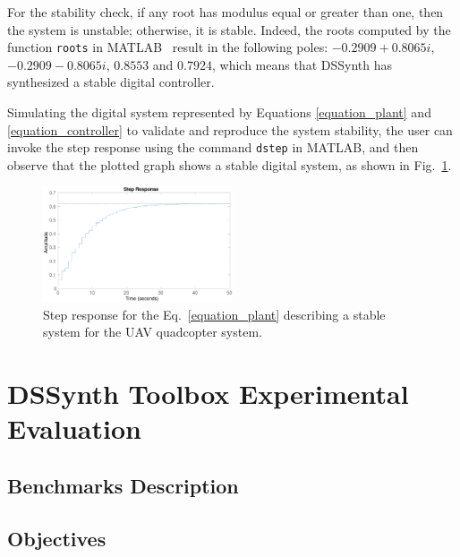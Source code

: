 \documentclass[10pt,conference]{IEEEtran}
\newcommand\tool{{DSSynth Toolbox}\xspace}
\begin{document}
For the stability check, if any root has modulus equal or greater than one, then the system is unstable; 
otherwise, it is stable. Indeed, the roots computed by the function \texttt{roots} 
in MATLAB~\cite{matlab-toolbox} result in the following poles: 
$-0.2909 + 0.8065i$, $-0.2909 - 0.8065i$, $0.8553$ and $0.7924$, 
which means that DSSynth has synthesized a stable digital controller.

Simulating the digital system represented by Equations \eqref{equation_plant} and \eqref{equation_controller} 
to validate and reproduce the system stability, the user can invoke the step response using the 
command \texttt{dstep} in MATLAB, and then observe that the plotted graph shows a stable digital system, 
as shown in Fig.~\ref{step-response}.
%
\begin{figure}[ht]
  \includegraphics[width=0.5\textwidth]{step-response.eps}
  \caption{Step response for the Eq.~\eqref{equation_plant} describing a stable system for the UAV quadcopter system.}
  \label{step-response}
\end{figure}

\section{\tool Experimental Evaluation}

\subsection{Benchmarks Description}


\subsection{Objectives}


\end{document}
